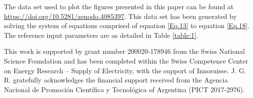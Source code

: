 \documentclass[draft]{agujournal2019}
\begin{document}
%




%
%
%
%
%
%
%
%

\acknowledgments
The data set used to plot the figures presented in this paper can be found at \url{https://doi.org/10.5281/zenodo.4085397}. This data set has been generated by solving  the system of equations comprised of equation \eqref{Eq.13} to equation \eqref{Eq.18}. The reference input parameters are as detailed in Table \ref{table:1}. 

This work is supported by grant number 200020-178946 from the Swiss National Science Foundation and has been completed within the Swiss Competence Center on Energy Research – Supply of Electricity, with the support of Innosuisse. J. G. R. gratefully acknowledges the financial support received from the Agencia Nacional de Promoción Científica y Tecnológica of Argentina (PICT 2017-2976).

%
%


%
%
%
%
%
\end{document}
